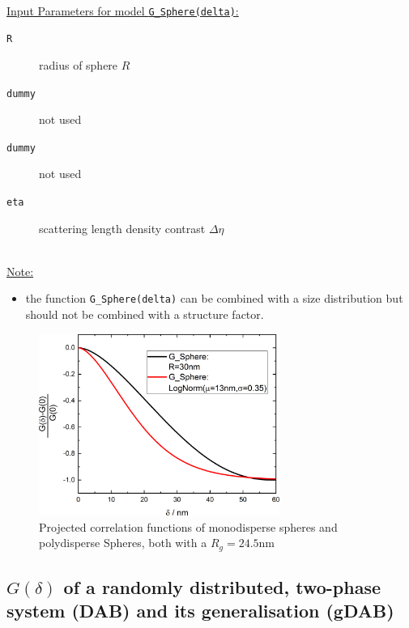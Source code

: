 \hspace{1pt}\\
\underline{Input Parameters for model \texttt{G\_Sphere(delta)}:}\\
\begin{description}
\item[\texttt{R}] radius of sphere $R$
\item[\texttt{dummy}] not used
\item[\texttt{dummy}] not used
\item[\texttt{eta}] scattering length density contrast $\Delta\eta$
\end{description}

\hspace{1pt}\\
\underline{Note:}
\begin{itemize}
\item the function \texttt{G\_Sphere(delta)} can be combined with a size distribution but should not be combined with a structure factor.
\end{itemize}

\begin{figure}[htb]
\begin{center}
\includegraphics[width=0.7\textwidth]{../images/form_factor/SESANS/G_Sphere.png}
\end{center}
\caption{Projected correlation functions of monodisperse spheres and polydisperse Spheres, both with a $R_g=24.5$nm}
\label{fig:G_Sphere}
\end{figure}

\subsection{$G(\delta)$ of a randomly distributed, two-phase system (DAB) and its generalisation (gDAB)}~\\
\label{sec:Gz_DAB_gDAB}

